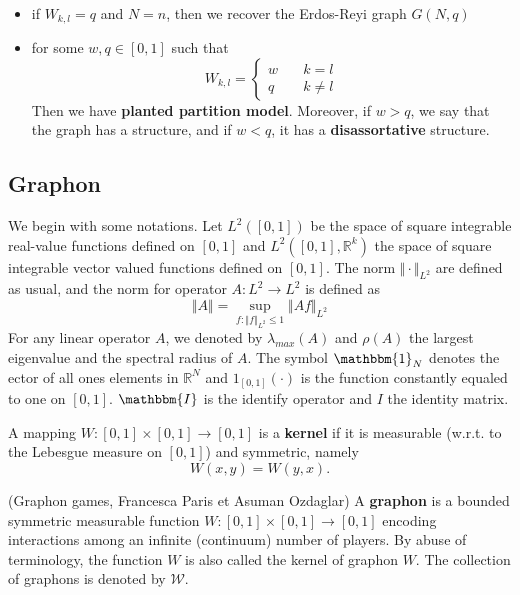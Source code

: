 \begin{remark}
	\ 
	\begin{itemize}
		\item if $W_{k,l} = q$ and $N=n$, then we recover the Erdos-Reyi graph $G(N,q)$
		\item for some $w,q \in [0,1]$ such that
		$$
			W_{k,l} = \left\{ \begin{array}{ll} w &\quad k = l \\ q & \quad k \neq l \end{array} \right.
		$$
		Then we have \textbf{planted partition model}. Moreover, if $w > q$, we say that the graph has a  structure, and if $w <q$, it has a \textbf{disassortative} structure.
	\end{itemize}
\end{remark}


\subsection{Graphon}

We begin with some notations. Let $L^2([0,1])$ be the space of square integrable real-value functions defined on $[0,1]$ and $L^2([0,1], \mathbb{R}^k)$ the space of square integrable vector valued functions defined on $[0,1]$. The norm $\Vert \cdot \Vert_{L^2}$ are defined as usual, and the norm for operator $A: L^2 \to L^2$ is defined as
$$
	\Vert A \Vert = \sup_{f: \Vert f \Vert_{L^2} \leq 1} \Vert A f \Vert_{L^2} 
$$
For any linear operator $A$, we denoted by $\lambda_{max}(A)$ and $\rho(A)$ the largest eigenvalue and the spectral radius of $A$. The symbol $\mathbbm{1}_N$  denotes the ector of all ones elements in $\mathbb{R}^N$ and $1_{[0,1]}(\cdot)$ is the function constantly equaled to one on $[0,1]$. $\mathbbm{I}$ is the identify operator and $I$ the identity matrix. 

\begin{definition} 
	A mapping $W: [0,1] \times [0,1] \to [0,1]$ is a \textbf{kernel} if it is measurable (w.r.t. to the Lebesgue measure on $[0,1]$) and symmetric, namely
	$$
		W(x,y) = W(y,x).
	$$
\end{definition}


\begin{definition}(Graphon games, Francesca Paris et Asuman Ozdaglar)
	A \textbf{graphon} is a bounded symmetric measurable function $W: [0,1] \times [0,1] \to [0,1]$ encoding interactions among an infinite (continuum) number of players. By abuse of terminology, the function $W$ is also called the kernel of graphon $W$. The collection of graphons is denoted by $\mathcal{W}$.
\end{definition}

